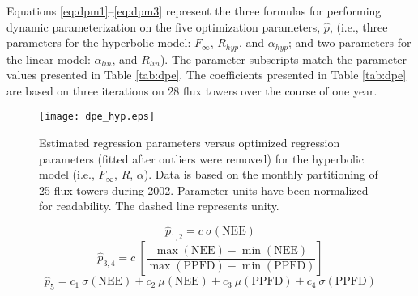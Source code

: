 Equations \ref{eq:dpm1}--\ref{eq:dpm3} represent the three formulas for performing dynamic parameterization on the five optimization parameters, $\hat{p}$, (i.e., three parameters for the hyperbolic model: $F_{\infty}$, $R_{hyp}$, and $\alpha_{hyp}$; and two parameters for the linear model: $\alpha_{lin}$, and $R_{lin}$).  
The parameter subscripts match the parameter values presented in Table \ref{tab:dpe}.  
The coefficients presented in Table \ref{tab:dpe} are based on three iterations on 28 flux towers over the course of one year.
\begin{figure}[h!]
    \texttt{[image: dpe\_hyp.eps]}
    \caption{Estimated regression parameters versus optimized regression 
    parameters (fitted after outliers were removed) for the hyperbolic model 
    (i.e., $F_{\infty}$, $R$, $\alpha$). Data is based on the monthly 
    partitioning of 25 flux towers during 2002. Parameter units have been 
    normalized for readability. The dashed line represents unity.}
    \label{fig:hmodest}
\end{figure}
\begin{equation}
\label{eq:dpm1}
    \hat{p}_{1,2} = c\: \sigma\left(\text{NEE}\right)
\end{equation}
\begin{equation}
\label{eq:dpm2}
    \hat{p}_{3,4} = c\: \left[
    \frac{\max\left(\text{NEE}\right)
    -\min\left(\text{NEE}\right)}{\max\left(\text{PPFD}\right)
    -\min\left(\text{PPFD}\right)}
    \right]
\end{equation}
\begin{equation}
\label{eq:dpm3}
    \hat{p}_{5} = c_{1}\: \sigma\left(\text{NEE}\right) 
    + c_{2}\: \mu\left(\text{NEE}\right) 
    + c_{3}\: \mu\left(\text{PPFD}\right) 
    + c_{4}\: \sigma\left(\text{PPFD}\right)
\end{equation}

